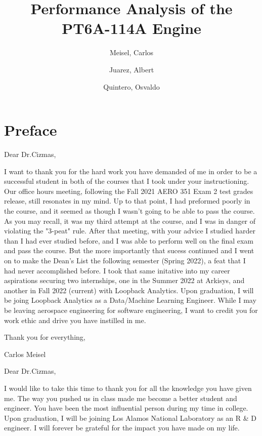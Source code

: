 \documentclass[titlepage]{article}
\author{
    Meisel, Carlos \\
  \and
  Juarez, Albert\\
  \and
    Quintero, Osvaldo\\
}
\title{Performance Analysis of the PT6A-114A Engine}
\begin{document}
  \maketitle

  \tableofcontents

  \vspace*{4cm}

    \section{Preface}

    Dear Dr.Cizmas,
    \vspace{0.5cm}

    I want to thank you for the hard work you have demanded of me in order to be a successful student in both of the courses that I took
    under your instructioning. Our office hours meeting, following the Fall 2021 AERO 351 Exam 2 test grades release, still resonates in my mind. 
    Up to that point, I had preformed poorly in the course, and it seemed as though I wasn't going to be able to pass the course. 
    As you may recall, it was my third attempt at the course, and I was in danger of violating the "3-peat" rule. After that meeting, with your advice
    I studied harder than I had ever studied before, and I was able to perform well on the final exam and pass the course. But the more 
    importantly that sucess continued and I went on to make the Dean's List the following semester (Spring 2022), a feat that I had never accomplished before.
    I took that same initative into my career aspirations securing two internships, one in the Summer 2022 at Arkisys, and another in Fall 2022 
    (current) with Loopback Analytics. Upon graduation, I will be joing Loopback Analytics as a Data/Machine Learning Engineer. While I 
    may be leaving aerospace engineering for software engineering, I want to credit you for work ethic and drive you have instilled in me.

    \vspace{0.5cm}

    Thank you for everything, 

    Carlos Meisel

    \vspace{1cm}

    Dear Dr.Cizmas,
    \vspace{0.5cm}

    I would like to take this time to thank you for all the knowledge you have given me. The way you pushed us in class made me become a better student and engineer. You have been the most influential person during my time in college. Upon graduation, I will be joining Los Alamos National Laboratory as an R \& D engineer. I will forever be grateful for the impact you have made on my life.
\end{document}
